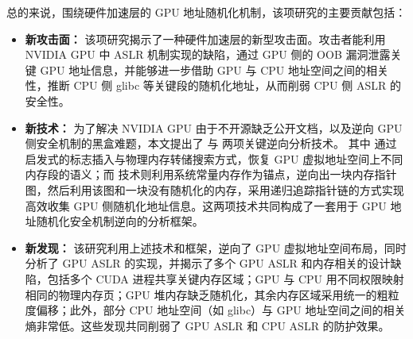总的来说，围绕硬件加速层的 GPU 地址随机化机制，该项研究的主要贡献包括：
\begin{itemize}
\item \textbf{新攻击面：} 该项研究揭示了一种硬件加速层的新型攻击面。攻击者能利用 NVIDIA GPU 中 ASLR 机制实现的缺陷，通过 GPU 侧的 OOB 漏洞泄露关键 GPU 地址信息，并能够进一步借助 GPU 与 CPU 地址空间之间的相关性，推断 CPU 侧 glibc 等关键段的随机化地址，从而削弱 CPU 侧 ASLR 的安全性。
\item \textbf{新技术：} 为了解决 NVIDIA GPU 由于不开源缺乏公开文档，以及逆向 GPU 侧安全机制的黑盒难题，本文提出了  与  两项关键逆向分析技术。 其中  通过启发式的标志插入与物理内存转储搜索方式，恢复 GPU 虚拟地址空间上不同内存段的语义；而 技术则利用系统常量内存作为锚点，逆向出一块内存指针图，然后利用该图和一块没有随机化的内存，采用递归追踪指针链的方式实现高效收集 GPU 侧随机化地址信息。这两项技术共同构成了一套用于 GPU 地址随机化安全机制逆向的分析框架。
\item \textbf{新发现：} 该研究利用上述技术和框架，逆向了 GPU 虚拟地址空间布局，同时分析了 GPU ASLR 的实现，并揭示了多个 GPU ASLR 和内存相关的设计缺陷，包括多个 CUDA 进程共享关键内存区域；GPU 与 CPU 用不同权限映射相同的物理内存页；GPU 堆内存缺乏随机化，其余内存区域采用统一的粗粒度偏移；此外，部分 CPU 地址空间（如 glibc）与 GPU 地址空间之间的相关熵非常低。这些发现共同削弱了 GPU ASLR 和 CPU ASLR 的防护效果。
\end{itemize}


